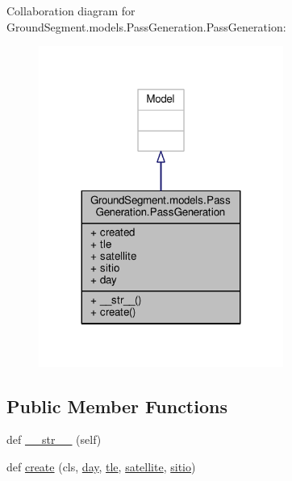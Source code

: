 Collaboration diagram for Ground\+Segment.\+models.\+Pass\+Generation.\+Pass\+Generation\+:\nopagebreak
\begin{figure}[H]
\begin{center}
\leavevmode
\includegraphics[width=227pt]{class_ground_segment_1_1models_1_1_pass_generation_1_1_pass_generation__coll__graph}
\end{center}
\end{figure}
\subsection*{Public Member Functions}
\begin{DoxyCompactItemize}
\item 
def \hyperlink{class_ground_segment_1_1models_1_1_pass_generation_1_1_pass_generation_a07354412d0bbfed5b5793458b6b42faf}{\+\_\+\+\_\+str\+\_\+\+\_\+} (self)
\item 
def \hyperlink{class_ground_segment_1_1models_1_1_pass_generation_1_1_pass_generation_aca8b71f499f46286ed32051f3c3a3234}{create} (cls, \hyperlink{class_ground_segment_1_1models_1_1_pass_generation_1_1_pass_generation_a0468102949615d7326a6b3c3a270994f}{day}, \hyperlink{class_ground_segment_1_1models_1_1_pass_generation_1_1_pass_generation_a71db0ead15e88702108257298c413ffe}{tle}, \hyperlink{class_ground_segment_1_1models_1_1_pass_generation_1_1_pass_generation_a0f1c573d07a1127b70c0e4b3085e0149}{satellite}, \hyperlink{class_ground_segment_1_1models_1_1_pass_generation_1_1_pass_generation_a3917c0e67d8a74db52404c6696d2e1c8}{sitio})
\end{DoxyCompactItemize}

